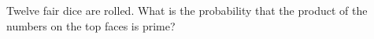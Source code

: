 Twelve fair dice are rolled. What is the probability that the product of the numbers on the top faces is prime?
